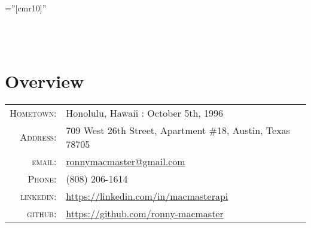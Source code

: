 \documentclass[a4paper,10pt]{article}
\begin{document}

\pagestyle{empty} %

\font\fb=''[cmr10]'' %

\par{\centering
	{} \\\vspace{3mm}
	{} \\\vspace{3mm}
\par}

\section{Overview}

\begin{tabular}{rl}
    \textsc{Hometown:}	& Honolulu, Hawaii : October 5th, 1996 \\
    \textsc{Address:}   & 709 West 26th Street, Apartment \#18, Austin, Texas 78705 \\
	\textsc{email:}     & \href{mailto:ronnymacmaster@gmail.com}{ronnymacmaster@gmail.com} \\
	\textsc{Phone:}     & (808) 206-1614 \\ 
	\textsc{linkedin:}	& \href{https://linkedin.com/in/macmasterapi}{https://linkedin.com/in/macmasterapi} \\
	\textsc{\color{medRed}github:}	& \href{https://github.com/ronny-macmaster}{https://github.com/ronny-macmaster} 
\end{tabular}

\end{document}
